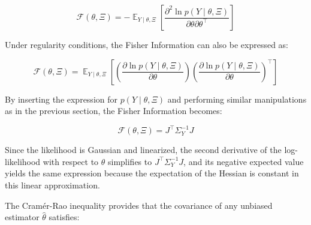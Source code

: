 \documentclass[../Article_Design_of_Experiment.tex]{subfiles}
\begin{document}
	{\footnotesize \begin{equation} \mathcal{F}(\theta, \Xi) = -\mathop{\mathbb{E}}_{Y \mid \theta, \Xi} \left[ \frac{\partial^2 \ln p \left( Y \mid \theta, \Xi \right)}{\partial \theta \partial \theta^\top} \right] \end{equation} }
	
	Under regularity conditions, the Fisher Information can also be expressed as:
	
	{\footnotesize \begin{equation} \mathcal{F}(\theta, \Xi) = \mathop{\mathbb{E}}_{Y \mid \theta, \Xi} \left[ \left( \frac{\partial \ln p\left( Y \mid \theta, \Xi \right)}{\partial \theta} \right) \left( \frac{\partial \ln p\left( Y \mid \theta, \Xi \right)}{\partial \theta} \right)^\top \right] \end{equation} }
	
	By inserting the expression for $p\left( Y \mid \theta, \Xi \right)$ and performing similar manipulations as in the previous section, the Fisher Information becomes:
	
	{\footnotesize \begin{equation} \mathcal{F}(\theta, \Xi) = J^\top \Sigma_Y^{-1} J \end{equation} }
	
	Since the likelihood is Gaussian and linearized, the second derivative of the log-likelihood with respect to $\theta$ simplifies to $J^\top \Sigma_Y^{-1} J$, and its negative expected value yields the same expression because the expectation of the Hessian is constant in this linear approximation.
	\begin{comment}
		
	Under the hypotheses that:
	
	\begin{itemize}
		\item The set of all data vectors $Y$ with $p(Y \mid \theta, \Xi) > 0$ does not depend on $\theta$.
		\item The partial derivatives $\frac{\partial p(Y \mid \theta, \Xi)}{\partial \theta_i}$ for $i=1,2,...,n_\theta$ are absolutely integrable.
		\item The expected value $\mathop{\mathbb{E}}_{Y \mid \theta, \Xi} \left[ \frac{\partial^2 \ln p \left( Y \mid \theta, \Xi \right)}{\partial \theta \partial \theta^\top} \right]$ exists and is invertible.
	\end{itemize}
	
	\end{comment}
	The Cramér-Rao inequality provides that the covariance of any unbiased estimator $\hat{\theta}$ satisfies:
	
\end{document}

